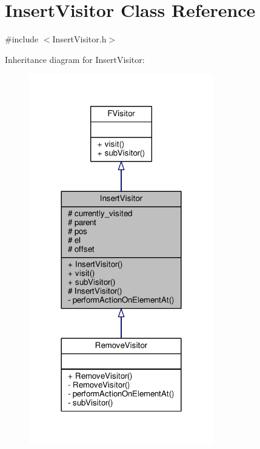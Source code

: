 \hypertarget{classInsertVisitor}{}\section{Insert\+Visitor Class Reference}
\label{classInsertVisitor}


{\ttfamily \#include $<$Insert\+Visitor.\+h$>$}



Inheritance diagram for Insert\+Visitor\+:
\nopagebreak
\begin{figure}[H]
\begin{center}
\leavevmode
\includegraphics[width=228pt]{classInsertVisitor__inherit__graph}
\end{center}
\end{figure}


